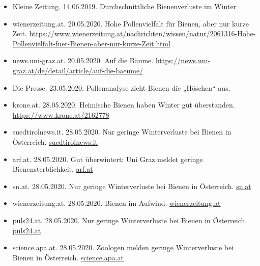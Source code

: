 \begin{itemize}
    \item
    Kleine Zeitung. 14.06.2019. Durchschnittliche Bienenverluste im Winter
    
    \item
    wienerzeitung.at. 20.05.2020. Hohe Pollenvielfalt für Bienen, aber nur kurze Zeit. \url{https://www.wienerzeitung.at/nachrichten/wissen/natur/2061316-Hohe-Pollenvielfalt-fuer-Bienen-aber-nur-kurze-Zeit.html}
    
    \item
    news.uni-graz.at. 20.05.2020. Auf die Bäume. 
    \url{https://news.uni-graz.at/de/detail/article/auf-die-baeume/}
    
    \item
    Die Presse. 23.05.2020. Pollenanalyse zieht Bienen die „Höschen“ aus.
    
    \item
    krone.at. 28.05.2020. Heimische Bienen haben Winter gut überstanden. 
    \url{https://www.krone.at/2162778}
    
    \item
    suedtirolnews.it. 28.05.2020. Nur geringe Winterverluste bei Bienen in Österreich. \href{https://www.suedtirolnews.it/wirtschaft/nur-geringe-winterverluste-bei-bienen-in-oesterreich}{suedtirolnews.it}
    
    \item
    arf.at. 28.05.2020. Gut überwintert: Uni Graz meldet geringe Bienensterblichkeit. \href{https://www.arf.at/2020/05/28/gut-ueberwintert-uni-graz-meldet-geringe-bienensterblichkeit/}{arf.at}
    
    \item
    sn.at. 28.05.2020. Nur geringe Winterverluste bei Bienen in Österreich. \href{https://www.sn.at/panorama/oesterreich/nur-geringe-winterverluste-bei-bienen-in-oesterreich-88150126}{sn.at}
    
    \item
    wienerzeitung.at. 28.05.2020. Bienen im Aufwind. \href{https://www.wienerzeitung.at/nachrichten/wissen/natur/2062201-Bienen-im-Aufwind.html}{wienerzeitung.at}
    
    \item
    puls24.at. 28.05.2020. Nur geringe Winterverluste bei Bienen in Österreich. \href{https://www.puls24.at/news/chronik/nur-geringe-winterverluste-bei-bienen-in-oesterreich/205520}{puls24.at}
    
    \item
    science.apa.at. 28.05.2020. Zoologen melden geringe Winterverluste bei Bienen in Österreich. \href{https://science.apa.at/rubrik/natur_und_technik/Zoologen_melden_geringe_Winterverluste_bei_Bienen_in_Oesterreich/SCI_20200528_SCI39391351454789954}{science.apa.at}
    

\end{itemize}
